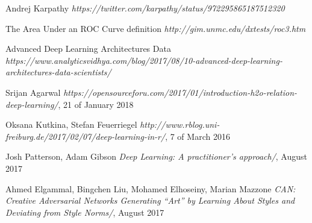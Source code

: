 \documentclass[titlepage,openright,twoside,a4paper,final,12pt,spanish]{book}
\begin{document}
\begin{thebibliography}{9}
  Andrej Karpathy 
{\em https://twitter.com/karpathy/status/972295865187512320}

 The Area Under an ROC Curve definition 
{\em http://gim.unmc.edu/dxtests/roc3.htm}

 Advanced Deep Learning Architectures Data
{\em https://www.analyticsvidhya.com/blog/2017/08/10-advanced-deep-learning-architectures-data-scientists/}

 
  Srijan Agarwal
{\em https://opensourceforu.com/2017/01/introduction-h2o-relation-deep-learning/}, 21 of January 2018
 
  Oksana Kutkina, Stefan Feuerriegel
{\em http://www.rblog.uni-freiburg.de/2017/02/07/deep-learning-in-r/}, 7 of March 2016 
 
  Josh Patterson, Adam Gibson
{\em Deep Learning: A practitioner's approach/}, August 2017

 Ahmed Elgammal, Bingchen Liu, Mohamed Elhoseiny, Marian Mazzone {\em CAN: Creative Adversarial Networks Generating “Art” by Learning About Styles and Deviating from Style Norms/}, August 2017

\end{thebibliography}
\end{document}
